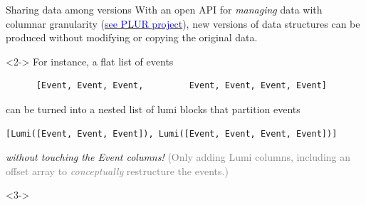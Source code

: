\documentclass{beamer}
\begin{document}
\begin{frame}[fragile]{Sharing data among versions}
\vspace{0.5 cm}
With an open API for {\it managing} data with columnar granularity (\href{https://github.com/diana-hep/plur}{\textcolor{blue}{see PLUR project}}), new versions of data structures can be produced without modifying or copying the original data.

\vspace{0.5 cm}
\begin{uncoverenv}<2->
For instance, a flat list of events

{\scriptsize\begin{verbatim}
      [Event, Event, Event,         Event, Event, Event, Event]
\end{verbatim}}

can be turned into a nested list of lumi blocks that partition events

{\scriptsize\begin{verbatim}
[Lumi([Event, Event, Event]), Lumi([Event, Event, Event, Event])]
\end{verbatim}}

{\it without touching the Event columns!} \textcolor{gray}{(Only adding Lumi columns, including an offset array to {\it conceptually} restructure the events.)}
\end{uncoverenv}

\vspace{0.5 cm}
\begin{uncoverenv}<3->
\end{uncoverenv}
\end{frame}
\end{document}

